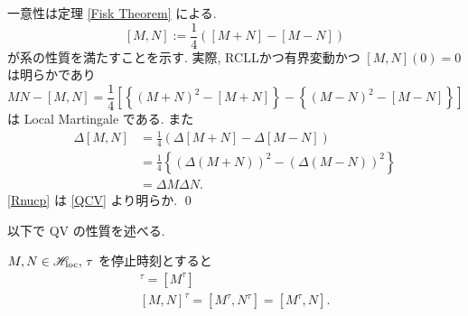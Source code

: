 \documentclass{ltjsarticle}
\begin{document}
\begin{prf}
	一意性は定理 \ref{Fisk Theorem} による.
	\begin{equation}		\label{QCV}
		[M, N] := \frac{1}{4} \left( [M + N] - [M - N] \right)
	\end{equation}
	が系の性質を満たすことを示す.
	実際, RCLLかつ有界変動かつ \( [M, N](0) = 0 \) は明らかであり
	\[
		MN - [M, N]
		=
		\frac{1}{4} \left[ \left\{ (M + N )^2 - [M + N] \right\}
		- \left\{ (M - N )^2 - [M - N] \right\} \right]
	\]
	は Local Martingale である. また
	\begin{equation}
		\begin{aligned}
			\Delta [M, N] & =	\frac{1}{4} \left(\Delta [M + N] - \Delta[M - N] \right)                              \\
			              & =	\frac{1}{4} \left\{ ( \Delta ( M + N ) )^2 - \left( \Delta (M - N) \right)^2 \right\} \\
			              & =	 \Delta M \Delta N.
		\end{aligned}
	\end{equation}
	\eqref{Rnucp} は \eqref{QCV} より明らか.
	\qed\end{prf}	%

以下で QV の性質を述べる.

\begin{prp}[QV 停止公式]	%
	\( M , N \in \mathscr{H}_{\mathrm{loc}} ,\, \tau \) を停止時刻とすると
	\begin{gather*}
		[M]^{\tau} = [M^{\tau}]
		\\
		[M, N]^{\tau} = [M^{\tau}, N^{\tau}] = [M^{\tau}, N].
	\end{gather*}
\end{prp}
\end{document}
